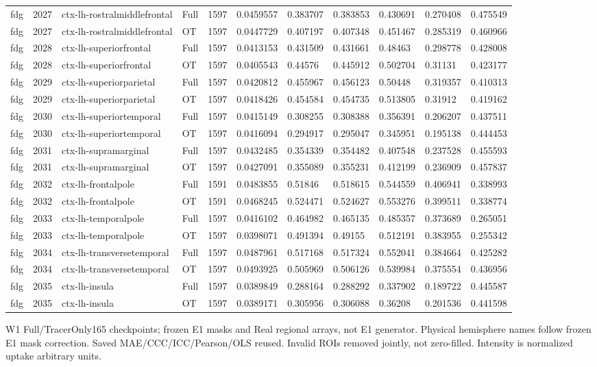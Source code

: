\begin{landscape}
\begin{longtable}{lllllllllll}
fdg & 2027 & ctx-lh-rostralmiddlefrontal & Full & 1597 & 0.0459557 & 0.383707 & 0.383853 & 0.430691 & 0.270408 & 0.475549 \\
fdg & 2027 & ctx-lh-rostralmiddlefrontal & OT & 1597 & 0.0447729 & 0.407197 & 0.407348 & 0.451467 & 0.285319 & 0.460966 \\
fdg & 2028 & ctx-lh-superiorfrontal & Full & 1597 & 0.0413153 & 0.431509 & 0.431661 & 0.48463 & 0.298778 & 0.428008 \\
fdg & 2028 & ctx-lh-superiorfrontal & OT & 1597 & 0.0405543 & 0.44576 & 0.445912 & 0.502704 & 0.31131 & 0.423177 \\
fdg & 2029 & ctx-lh-superiorparietal & Full & 1597 & 0.0420812 & 0.455967 & 0.456123 & 0.50448 & 0.319357 & 0.410313 \\
fdg & 2029 & ctx-lh-superiorparietal & OT & 1597 & 0.0418426 & 0.454584 & 0.454735 & 0.513805 & 0.31912 & 0.419162 \\
fdg & 2030 & ctx-lh-superiortemporal & Full & 1597 & 0.0415149 & 0.308255 & 0.308388 & 0.356391 & 0.206207 & 0.437511 \\
fdg & 2030 & ctx-lh-superiortemporal & OT & 1597 & 0.0416094 & 0.294917 & 0.295047 & 0.345951 & 0.195138 & 0.444453 \\
fdg & 2031 & ctx-lh-supramarginal & Full & 1597 & 0.0432485 & 0.354339 & 0.354482 & 0.407548 & 0.237528 & 0.455593 \\
fdg & 2031 & ctx-lh-supramarginal & OT & 1597 & 0.0427091 & 0.355089 & 0.355231 & 0.412199 & 0.236909 & 0.457837 \\
fdg & 2032 & ctx-lh-frontalpole & Full & 1591 & 0.0483855 & 0.51846 & 0.518615 & 0.544559 & 0.406941 & 0.338993 \\
fdg & 2032 & ctx-lh-frontalpole & OT & 1591 & 0.0468245 & 0.524471 & 0.524627 & 0.553276 & 0.399511 & 0.338774 \\
fdg & 2033 & ctx-lh-temporalpole & Full & 1597 & 0.0416102 & 0.464982 & 0.465135 & 0.485357 & 0.373689 & 0.265051 \\
fdg & 2033 & ctx-lh-temporalpole & OT & 1597 & 0.0398071 & 0.491394 & 0.49155 & 0.512191 & 0.383955 & 0.255342 \\
fdg & 2034 & ctx-lh-transversetemporal & Full & 1597 & 0.0487961 & 0.517168 & 0.517324 & 0.552041 & 0.384664 & 0.425282 \\
fdg & 2034 & ctx-lh-transversetemporal & OT & 1597 & 0.0493925 & 0.505969 & 0.506126 & 0.539984 & 0.375554 & 0.436956 \\
fdg & 2035 & ctx-lh-insula & Full & 1597 & 0.0389849 & 0.288164 & 0.288292 & 0.337902 & 0.189722 & 0.445587 \\
fdg & 2035 & ctx-lh-insula & OT & 1597 & 0.0389171 & 0.305956 & 0.306088 & 0.36208 & 0.201536 & 0.441598 \\
\end{longtable}
\noindent\parbox{\linewidth}{\footnotesize W1 Full/TracerOnly165 checkpoints; frozen E1 masks and Real regional arrays, not E1 generator. Physical hemisphere names follow frozen E1 mask correction. Saved MAE/CCC/ICC/Pearson/OLS reused. Invalid ROIs removed jointly, not zero-filled. Intensity is normalized uptake arbitrary units.}
\endgroup
\end{landscape}
